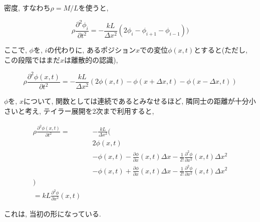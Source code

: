 \documentclass{jsarticle} \usepackage[dvipdfmx]{graphicx} \usepackage[dvipdfmx]{hyperref}
\begin{document}
密度, すなわち$\rho = M/L$を使うと, 

\begin{equation}
  \rho \frac{\partial^2 \phi_i}{\partial t^2} = -\frac{kL}{\Delta x^2} ( 2 \phi_i - \phi_{i + 1} - \phi_{i - 1}) )
\end{equation}

ここで, $\phi$を, $i$の代わりに, あるポジション$x$での変位$\phi(x, t)$とすると(ただし, この段階ではまだ$x$は離散的の認識), 

\begin{equation}
  \rho \frac{\partial^2 \phi(x, t)}{\partial t^2} = -\frac{kL}{\Delta x^2} ( 2 \phi(x, t) - \phi(x + \Delta x, t) - \phi(x - \Delta x, t) )
\end{equation}

$\phi$を, $x$について, 関数としては連続であるとみなせるほど, 隣同士の距離が十分小さいと考え, テイラー展開を2次まで利用すると, 

\begin{eqnarray}
  \rho \frac{\partial^2 \phi(x, t)}{\partial t^2}
  = && -\frac{kL}{\Delta x^2} ( \nonumber \\
    && 2 \phi(x, t) \nonumber \\ 
    && - \phi(x, t) - \frac{\partial \phi}{\partial x}(x, t) \Delta x - \frac{1}{2!}\frac{\partial^2 \phi}{\partial x^2}(x, t)\Delta x^2 \nonumber\\
    && - \phi(x, t) + \frac{\partial \phi}{\partial x}(x, t) \Delta x - \frac{1}{2!}\frac{\partial^2 \phi}{\partial x^2}(x, t)\Delta x^2 \nonumber\\
        ) \nonumber \\
    = kL\frac{\partial^2 \phi}{\partial x^2}(x, t) 
\end{eqnarray}

これは, 当初の形になっている. 
\end{document}
